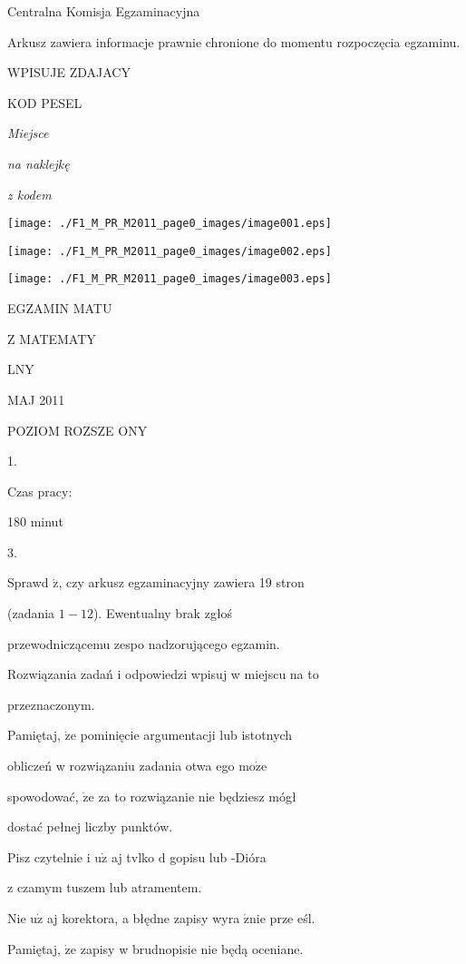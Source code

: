 \documentclass[a4paper,12pt]{article}
\begin{document}
Centralna Komisja Egzaminacyjna

Arkusz zawiera informacje prawnie chronione do momentu rozpoczęcia egzaminu.

WPISUJE ZDAJACY

KOD PESEL

{\it Miejsce}

{\it na naklejkę}

{\it z kodem}
\begin{center}
\texttt{[image: ./F1\_M\_PR\_M2011\_page0\_images/image001.eps]}

\texttt{[image: ./F1\_M\_PR\_M2011\_page0\_images/image002.eps]}

\texttt{[image: ./F1\_M\_PR\_M2011\_page0\_images/image003.eps]}
\end{center}
EGZAMIN MATU

Z MATEMATY

LNY

MAJ 2011

POZIOM ROZSZE ONY

1.

Czas pracy:

180 minut

3.

Sprawd $\acute{\mathrm{z}}$, czy arkusz egzaminacyjny zawiera 19 stron

(zadania $1-12$). Ewentualny brak zgłoś

przewodniczącemu zespo nadzorującego egzamin.

Rozwiązania zadań i odpowiedzi wpisuj w miejscu na to

przeznaczonym.

Pamiętaj, $\dot{\mathrm{z}}\mathrm{e}$ pominięcie argumentacji lub istotnych

obliczeń w rozwiązaniu zadania otwa ego $\mathrm{m}\mathrm{o}\dot{\mathrm{z}}\mathrm{e}$

spowodować, $\dot{\mathrm{z}}\mathrm{e}$ za to rozwiązanie nie będziesz mógł

dostać pełnej liczby punktów.

Pisz czytelnie i $\mathrm{u}\dot{\mathrm{z}}$ aj tvlko $\mathrm{d}$ gopisu lub -Dióra

z czamym tuszem lub atramentem.

Nie $\mathrm{u}\dot{\mathrm{z}}$ aj korektora, a błędne zapisy wyra $\acute{\mathrm{z}}\mathrm{n}\mathrm{i}\mathrm{e}$ prze eśl.

Pamiętaj, $\dot{\mathrm{z}}\mathrm{e}$ zapisy w brudnopisie nie będą oceniane.
\end{document}
